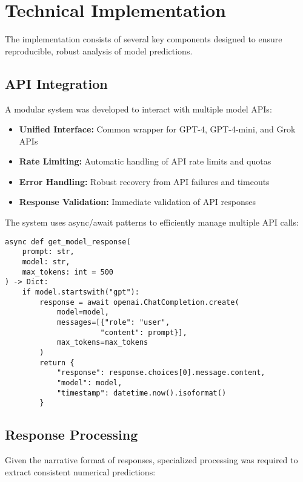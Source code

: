 \section{Technical Implementation}\label{sec:technical}

The implementation consists of several key components designed to ensure reproducible, robust analysis of model predictions.

\subsection{API Integration}

A modular system was developed to interact with multiple model APIs:

\begin{itemize}
    \item \textbf{Unified Interface:} Common wrapper for GPT-4, GPT-4-mini, and Grok APIs
    \item \textbf{Rate Limiting:} Automatic handling of API rate limits and quotas
    \item \textbf{Error Handling:} Robust recovery from API failures and timeouts
    \item \textbf{Response Validation:} Immediate validation of API responses
\end{itemize}

The system uses async/await patterns to efficiently manage multiple API calls:

\begin{verbatim}
async def get_model_response(
    prompt: str,
    model: str,
    max_tokens: int = 500
) -> Dict:
    if model.startswith("gpt"):
        response = await openai.ChatCompletion.create(
            model=model,
            messages=[{"role": "user", 
                      "content": prompt}],
            max_tokens=max_tokens
        )
        return {
            "response": response.choices[0].message.content,
            "model": model,
            "timestamp": datetime.now().isoformat()
        }
\end{verbatim}

\subsection{Response Processing}

Given the narrative format of responses, specialized processing was required to extract consistent numerical predictions:


